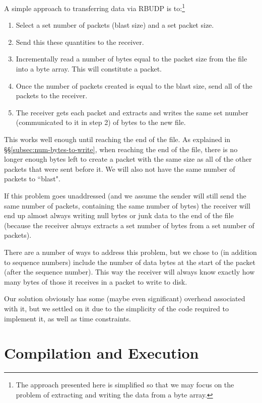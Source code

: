 \documentclass[10pt, a4paper]{article}
\begin{document}
A simple approach to transferring data via RBUDP is to:\footnote{The approach
presented here is simplified so that we may focus on the problem of
extracting and writing the data from a byte array.}
\begin{enumerate}
  \item Select a set number of packets (blast size) and a set packet size.
  \item Send this these quantities to the receiver.
  \item Incrementally read a number of bytes equal to the packet size from the
    file into a byte array. This will constitute a packet.
  \item Once the number of packets created is equal to the blast size, send all
    of the packets to the receiver.
  \item The receiver gets each packet and extracts and writes the same set
    number (communicated to it in step 2) of bytes to the new file.
\end{enumerate}
This works well enough until reaching the end of the file. As explained in
\S\S\ref{subsec:num-bytes-to-write}, when reaching the end of the file, there is
no longer enough bytes left to create a packet with the same size as all of the
other packets that were sent before it. We will also not have the same number of
packets to ``blast".

If this problem goes unaddressed (and we assume the sender
will still send the same number of packets, containing the same number of bytes)
the receiver will end up almost always writing null bytes or junk data to the
end of the file (because the receiver always extracts a set number of bytes
from a set number of packets).

There are a number of ways to address this problem, but we chose to (in addition
to sequence numbers) include the number of data bytes at the start of the packet
(after the sequence number). This way the receiver will always know exactly how
many bytes of those it receives in a packet to write to disk.

Our solution obviously has some (maybe even significant) overhead associated
with it, but we settled on it due to the simplicity of the code required to
implement it, as well as time constraints.


\section{Compilation and Execution}
\label{sec:comp-exec}
\end{document}
